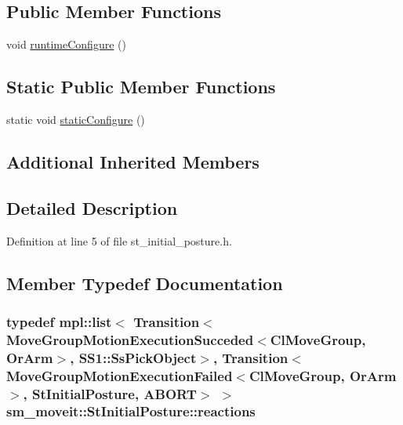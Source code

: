 \subsection*{Public Member Functions}
\begin{DoxyCompactItemize}
\item 
void \hyperlink{structsm__moveit_1_1StInitialPosture_af6985ad418eb655f35bd182973d7234a}{runtime\+Configure} ()
\end{DoxyCompactItemize}
\subsection*{Static Public Member Functions}
\begin{DoxyCompactItemize}
\item 
static void \hyperlink{structsm__moveit_1_1StInitialPosture_a54a2a80bf9a9b5d6838d727bc6ebff3f}{static\+Configure} ()
\end{DoxyCompactItemize}
\subsection*{Additional Inherited Members}


\subsection{Detailed Description}


Definition at line 5 of file st\+\_\+initial\+\_\+posture.\+h.



\subsection{Member Typedef Documentation}
\subsubsection[{\texorpdfstring{reactions}{reactions}}]{\setlength{\rightskip}{0pt plus 5cm}typedef mpl\+::list$<$ Transition$<${\bf Move\+Group\+Motion\+Execution\+Succeded}$<${\bf Cl\+Move\+Group}, {\bf Or\+Arm}$>$, {\bf S\+S1\+::\+Ss\+Pick\+Object}$>$, Transition$<${\bf Move\+Group\+Motion\+Execution\+Failed}$<${\bf Cl\+Move\+Group}, {\bf Or\+Arm}$>$, {\bf St\+Initial\+Posture}, {\bf A\+B\+O\+RT}$>$ $>$ {\bf sm\+\_\+moveit\+::\+St\+Initial\+Posture\+::reactions}}\hypertarget{structsm__moveit_1_1StInitialPosture_a0ca17de7a1f01a6c8e8904efb027f218}{}\label{structsm__moveit_1_1StInitialPosture_a0ca17de7a1f01a6c8e8904efb027f218}


